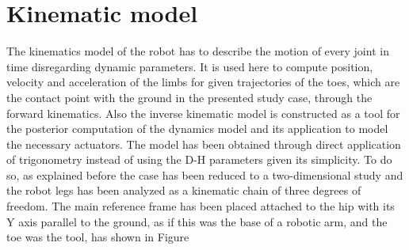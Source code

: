 
\section{Kinematic model}
\label{sec_kinematic_model}
The kinematics model of the robot has to describe the motion of every joint in time disregarding dynamic parameters.
It is used here to compute position, velocity and acceleration of the limbs for given trajectories of the toes, which are the contact point with the ground in the presented study case, through the forward kinematics.
Also the inverse kinematic model is constructed as a tool for the posterior computation of the dynamics model and its application to model the necessary actuators.
The model has been obtained through direct application of trigonometry instead of using the D-H parameters given its simplicity.
To do so, as explained before the case has been reduced to a two-dimensional study and the robot legs has been analyzed as a kinematic chain of three degrees of freedom.
The main reference frame has been placed attached to the hip with its Y axis parallel to the ground, as if this was the base of a robotic arm, and the toe was the tool, has shown in Figure  


